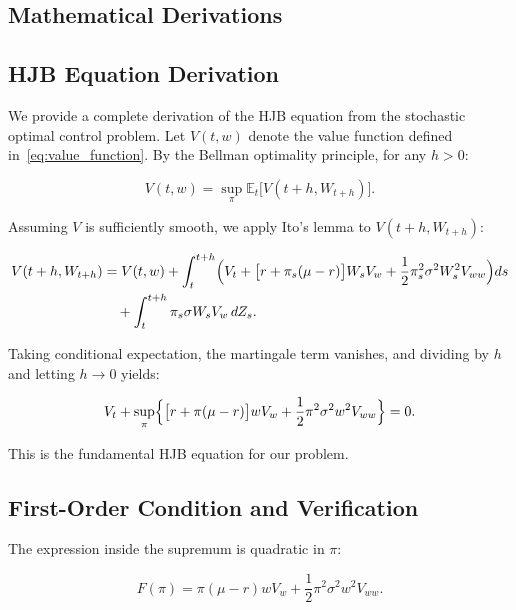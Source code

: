 \documentclass[12pt,a4paper]{article}
\begin{document}
\begin{appendices}

\section{Mathematical Derivations}
\label{app:derivations}

\subsection{HJB Equation Derivation}

We provide a complete derivation of the HJB equation from the stochastic optimal control problem. Let $V(t, w)$ denote the value function defined in~\eqref{eq:value_function}. By the Bellman optimality principle, for any $h > 0$:

\begin{equation}
\label{eq:bellman}
V(t, w) = \sup_{\pi} \mathbb{E}_t \bigl[ V(t+h, W_{t+h}) \bigr].
\end{equation}

Assuming $V$ is sufficiently smooth, we apply Ito's lemma to $V(t+h, W_{t+h})$:

\begin{align}
V(t+h, W_{t+h}) &= V(t, w) + \int_t^{t+h} \Bigl( V_t + \bigl[r + \pi_s(\mu - r)\bigr] W_s V_w + \frac{1}{2} \pi_s^2 \sigma^2 W_s^2 V_{ww} \Bigr) ds \notag \\
&\quad + \int_t^{t+h} \pi_s \sigma W_s V_w \, dZ_s.
\end{align}

Taking conditional expectation, the martingale term vanishes, and dividing by $h$ and letting $h \to 0$ yields:

\begin{equation}
\label{eq:hjb_dynamic}
V_t + \sup_{\pi} \Bigl\{ \bigl[r + \pi(\mu - r)\bigr] w V_w + \frac{1}{2} \pi^2 \sigma^2 w^2 V_{ww} \Bigr\} = 0.
\end{equation}

This is the fundamental HJB equation for our problem.

\subsection{First-Order Condition and Verification}

The expression inside the supremum is quadratic in $\pi$:

\begin{equation}
\label{eq:quadratic_pi}
F(\pi) = \pi(\mu - r) w V_w + \frac{1}{2} \pi^2 \sigma^2 w^2 V_{ww}.
\end{equation}


\end{appendices}
\end{document}
